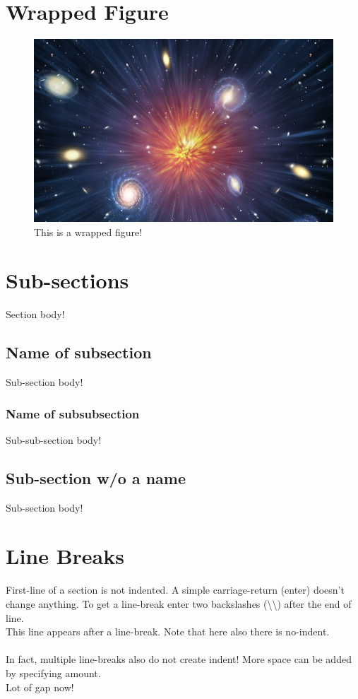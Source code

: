 \documentclass[12pt,twoside,a4paper]{article}
\begin{document}
\section{Wrapped Figure}
\blindtext[1]
\begin{figure} %
\centering %
\includegraphics[width=\linewidth]{universe.jpg} %
\caption{This is a wrapped figure!}
\end{figure}
\blindtext[1]




\section{Sub-sections}
Section body!
\subsection{Name of subsection}
Sub-section body!
\subsubsection{Name of subsubsection}
Sub-sub-section body!
\subsection*{Sub-section w/o a name}
Sub-section body!



\section{Line Breaks}
First-line of a section is not indented.
A simple carriage-return (enter) doesn't change anything.
To get a line-break enter two backslashes (\textbackslash\textbackslash) after the end of line.\\
This line appears after a line-break. Note that here also there is no-indent.\\\\
In fact, multiple line-breaks also do not create indent!
More space can be added by specifying amount.\\[20pt]
Lot of gap now!
\end{document}
